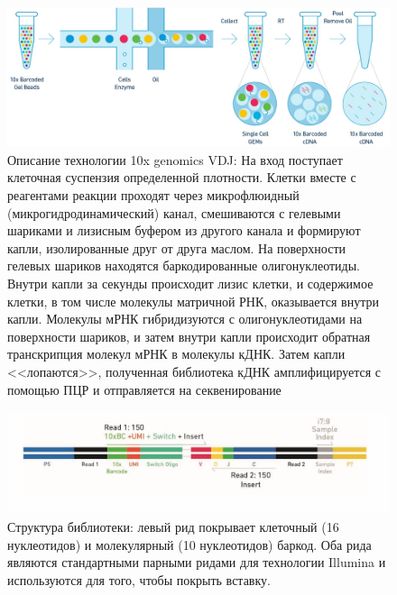 \documentclass{spbau-diploma}
\begin{document}
\begin{figure}[h!]
    \centering
    \includegraphics[width=.9\textwidth]{figures/10x_pipeline.png}
    \caption{Описание технологии 10x genomics VDJ: На вход поступает клеточная суспензия определенной плотности.
    Клетки вместе с реагентами реакции проходят через микрофлюидный (микрогидродинамический) канал, смешиваются с гелевыми шариками и лизисным буфером из другого канала и формируют капли, изолированные друг от друга маслом.
    На поверхности гелевых шариков находятся баркодированные олигонуклеотиды.
    Внутри капли за секунды происходит лизис клетки, и содержимое клетки, в том числе молекулы матричной РНК, оказывается внутри капли.
    Молекулы мРНК гибридизуются с олигонуклеотидами на поверхности шариков, и затем внутри капли происходит обратная транскрипция молекул мРНК в молекулы кДНК.
    Затем капли <<лопаются>>, полученная библиотека кДНК амплифицируется с помощью ПЦР и отправляется на секвенирование}
    \label{10x_pipeline}
\end{figure}

\begin{figure}[h!]
    \centering
    \includegraphics[width=.9\textwidth]{figures/10x_barcodes.png}
    \caption{Структура библиотеки: левый рид покрывает клеточный (16 нуклеотидов) и молекулярный (10 нуклеотидов) баркод.
    Оба рида являются стандартными парными ридами для технологии Illumina и используются для того, чтобы покрыть вставку.}

    \label{10x_barcodes}
\end{figure}
\end{document}
